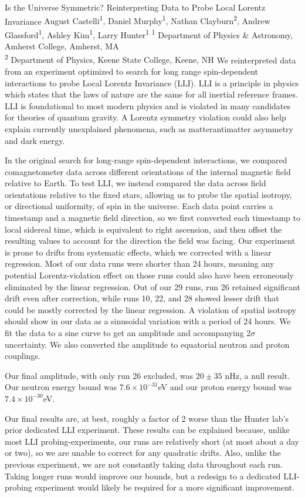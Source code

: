 \makeabstract
    {
    Is the Universe Symmetric? Reinterpreting Data to Probe Local Lorentz Invariance
    }
    {
    August Castelli\textsuperscript{1}, Daniel Murphy\textsuperscript{1}, Nathan Clayburn\textsuperscript{2}, Andrew Glassford\textsuperscript{1}, Ashley Kim\textsuperscript{1}, Larry Hunter\textsuperscript{1}
    }
    {
    \textsuperscript{1} Department of Physics \& Astronomy, Amherst College, Amherst, MA\\
\textsuperscript{2} Department of Physics, Keene State College, Keene, NH
    }
    {
    We reinterpreted data from an experiment optimized to search for long range spin-dependent interactions to probe Local Lorentz Invariance (LLI). LLI is a principle in physics which states that the laws of nature are the same for all inertial reference frames. LLI is foundational to most modern physics and is violated in many candidates for theories of quantum gravity. A Lorentz symmetry violation could also help explain currently unexplained phenomena, such as matter{\textendash}antimatter asymmetry and dark energy.
    }
    {
    In the original search for long-range spin-dependent interactions, we compared comagnetometer data across different orientations of the internal magnetic field relative to Earth. To test LLI, we instead compared the data across field orientations relative to the fixed stars, allowing us to probe the spatial isotropy, or directional uniformity, of spin in the universe. Each data point carries a timestamp and a magnetic field direction, so we first converted each timestamp to local sidereal time, which is equivalent to right ascension, and then offset the resulting values to account for the direction the field was facing. Our experiment is prone to drifts from systematic effects, which we corrected with a linear regression. Most of our data runs were shorter than 24 hours, meaning any potential Lorentz-violation effect on those runs could also have been erroneously eliminated by the linear regression. Out of our 29 runs, run 26 retained significant drift even after correction, while runs 10, 22, and 28 showed lesser drift that could be mostly corrected by the linear regression. A violation of spatial isotropy should show in our data as a sinusoidal variation with a period of 24 hours. We fit the data to a sine curve to get an amplitude and accompanying 2\ensuremath{\sigma} uncertainty. We also converted the amplitude to equatorial neutron and proton couplings.

    }
    {
    Our final amplitude, with only run 26 excluded, was $20 \pm 35$ nHz, a null result. Our neutron energy bound was $7.6 \times 10^{-31}$eV and our proton energy bound was $7.4 \times 10^{-30}$eV.
    }
    {
    Our final results are, at best, roughly a factor of 2 worse than the Hunter lab's prior dedicated LLI experiment. These results can be explained because, unlike most LLI probing-experiments, our runs are relatively short (at most about a day or two), so we are unable to correct for any quadratic drifts. Also, unlike the previous experiment, we are not constantly taking data throughout each run. Taking longer runs would improve our bounds, but a redesign to a dedicated LLI-probing experiment would likely be required for a more significant improvement.

    }

    \newpage
    